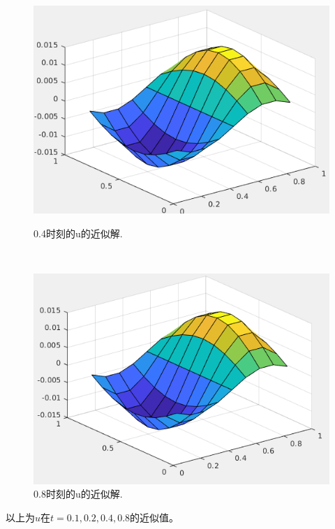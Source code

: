 \documentclass[12pt,a4paper]{article}
\begin{document}
\begin{figure}[ht]
	\begin{minipage}[t]{0.4\linewidth}%
		\centering     %
		\includegraphics[width=1.2\textwidth]{./figures/TIME04.png}
		\caption{0.4时刻的u的近似解.}%
		\label{fig:liuchengtu1}%
	\end{minipage} 
	\hfill
	\begin{minipage}[t]{0.4\linewidth}
		\centering
		\includegraphics[width=1.2\textwidth]{./figures/TIME08.png}
		\caption{0.8时刻的u的近似解.}%
		\label{fig:liuchengtu2}
	\end{minipage}
\end{figure}
\newpage
以上为$u$在$t=0.1,0.2,0.4,0.8$的近似值。
\end{document}
